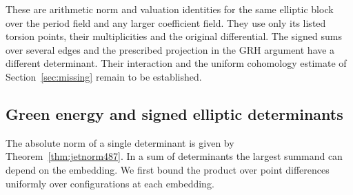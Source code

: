 \documentclass[a4paper,11pt]{article}
\theoremstyle{definition}
\theoremstyle{remark}
\numberwithin{equation}{section}
\begin{document}
These are arithmetic norm and valuation identities for the same
elliptic block over the period field and any larger coefficient
field. They use only its listed torsion points, their
multiplicities and the original differential. The signed sums
over several edges and the prescribed projection in the GRH
argument have a different determinant. Their interaction and the
uniform cohomology estimate of Section~\ref{sec:missing} remain
to be established.


\subsection{Green energy and signed elliptic determinants}
\label{sec:greenenergy488}

The absolute norm of a single determinant is given by
Theorem~\ref{thm:jetnorm487}. In a sum of determinants the largest
summand can depend on the embedding. We first bound the product over
point differences uniformly over configurations at each embedding.
\end{document}
